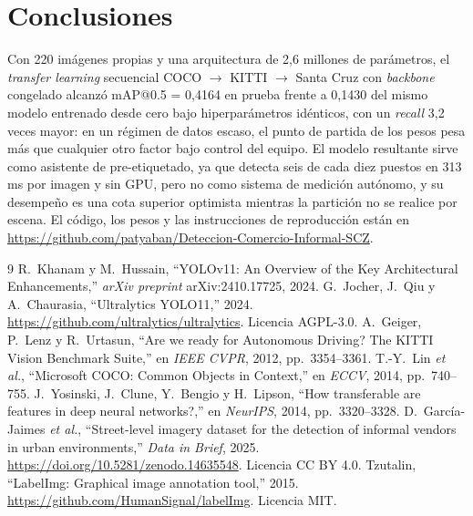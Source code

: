 \documentclass[10pt,a4paper]{article}
\newcommand{\repositorio}{https://github.com/patyaban/Deteccion-Comercio-Informal-SCZ}
\begin{document}
\section{Conclusiones}
Con 220 imágenes propias y una arquitectura de 2{,}6 millones de parámetros, el
\emph{transfer learning} secuencial COCO $\rightarrow$ KITTI $\rightarrow$ Santa Cruz con
\emph{backbone} congelado alcanzó mAP@0.5 = 0{,}4164 en prueba frente a 0{,}1430 del mismo
modelo entrenado desde cero bajo hiperparámetros idénticos, con un \emph{recall} 3{,}2
veces mayor: en un régimen de datos escaso, el punto de partida de los pesos pesa más que
cualquier otro factor bajo control del equipo. El modelo resultante sirve como asistente
de pre-etiquetado, ya que detecta seis de cada diez puestos en 313\,ms por imagen y sin
GPU, pero no como sistema de medición autónomo, y su desempeño es una cota superior
optimista mientras la partición no se realice por escena. El código, los pesos y las
instrucciones de reproducción están en \url{\repositorio}.

\begin{thebibliography}{9}\scriptsize
\setlength{\itemsep}{1pt}\setlength{\parskip}{0pt}
 R.~Khanam y M.~Hussain, ``YOLOv11: An Overview of the Key Architectural
Enhancements,'' \emph{arXiv preprint} arXiv:2410.17725, 2024.
 G.~Jocher, J.~Qiu y A.~Chaurasia, ``Ultralytics YOLO11,'' 2024.
\url{https://github.com/ultralytics/ultralytics}. Licencia AGPL-3.0.
 A.~Geiger, P.~Lenz y R.~Urtasun, ``Are we ready for Autonomous Driving?
The KITTI Vision Benchmark Suite,'' en \emph{IEEE CVPR}, 2012, pp.~3354--3361.
 T.-Y.~Lin \emph{et al.}, ``Microsoft COCO: Common Objects in Context,'' en
\emph{ECCV}, 2014, pp.~740--755.
 J.~Yosinski, J.~Clune, Y.~Bengio y H.~Lipson, ``How transferable are
features in deep neural networks?,'' en \emph{NeurIPS}, 2014, pp.~3320--3328.
 D.~García-Jaimes \emph{et al.}, ``Street-level imagery dataset for
the detection of informal vendors in urban environments,'' \emph{Data in Brief}, 2025.
\url{https://doi.org/10.5281/zenodo.14635548}. Licencia CC BY 4.0.
 Tzutalin, ``LabelImg: Graphical image annotation tool,'' 2015.
\url{https://github.com/HumanSignal/labelImg}. Licencia MIT.
\end{thebibliography}

\appendix
\end{document}
